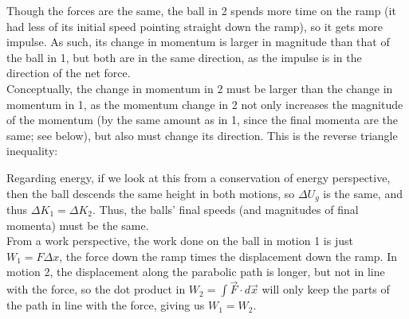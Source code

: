 \documentclass[]{article}
\begin{document}
\begin{TeacherMargin}
\noindent Though the forces are the same, the ball in 2 spends more time on the ramp (it had less of its initial speed pointing straight down the ramp), so it gets more impulse. As such, its change in momentum is larger in magnitude than that of the ball in 1, but both are in the same direction, as the impulse is in the direction of the net force. \\
Conceptually, the change in momentum in 2 must be larger than the change in momentum in 1, as the momentum change in 2 not only increases the magnitude of the momentum (by the same amount as in 1, since the final momenta are the same; see below), but also must change its direction. This is the reverse triangle inequality:
\begin{center}
\end{center}
\vspace{-10pt}
Regarding energy, if we look at this from a conservation of energy perspective, then the ball descends the same height in both motions, so $\Delta U_{g}$ is the same, and thus $\Delta K_{1} = \Delta K_{2}$. Thus, the balls' final speeds (and magnitudes of final momenta) must be the same. \\
From a work perspective, the work done on the ball in motion 1 is just $W_{1} = F\Delta x$, the force down the ramp times the displacement down the ramp. In motion 2, the displacement along the parabolic path is longer, but not in line with the force, so the dot product in $W_{2}=\int\vec{F}\cdot d\vec{x}$ will only keep the parts of the path in line with the force, giving us $W_{1}=W_{2}$.
\end{TeacherMargin}
\end{document}
